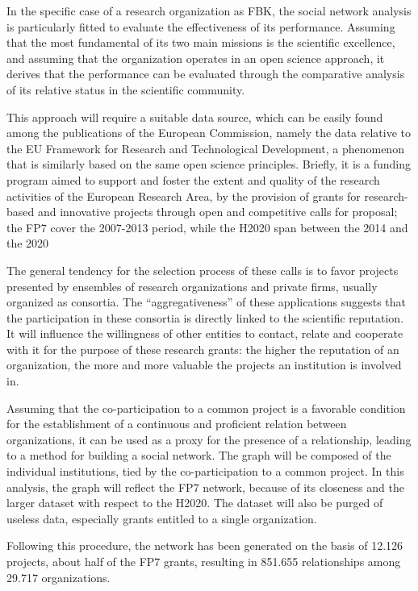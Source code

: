 In the specific case of a research organization as FBK, the social network analysis is particularly fitted to evaluate the effectiveness of its performance. Assuming that the most fundamental of its two main missions is the scientific excellence, and assuming that the organization operates in an open science approach, it derives that the performance can be evaluated through the comparative analysis of its relative status in the scientific community.

This approach will require a suitable data source, which can be easily found among the publications of the European Commission, namely the data relative to the EU Framework for Research and Technological Development, a phenomenon that is similarly based on the same open science principles. Briefly, it is a funding program aimed to support and foster the extent and quality of the research activities of the European Research Area, by the provision of grants for research-based and innovative projects through open and competitive calls for proposal; the FP7 cover the 2007-2013 period, while the H2020 span between the 2014 and the 2020

The general tendency for the selection process of these calls is to favor projects presented by ensembles of research organizations and private firms, usually organized as consortia. The \enquote{aggregativeness} of these applications suggests that the participation in these consortia is directly linked to the scientific reputation. It will influence the willingness of other entities to contact, relate and cooperate with it for the purpose of these research grants: the higher the reputation of an organization, the more and more valuable the projects an institution is involved in.

Assuming that the co-participation to a common project is a favorable condition for the establishment of a continuous and proficient relation between organizations, it can be used as a proxy for the presence of a relationship, leading to a method for building a social network. The graph will be composed of the individual institutions, tied by the co-participation to a common project. In this analysis, the graph will reflect the FP7 network, because of its closeness and the larger dataset with respect to the H2020. The dataset will also be purged of useless data, especially grants entitled to a single organization. 

Following this procedure, the network has been generated on the basis of 12.126 projects, about half of the FP7 grants, resulting in 851.655 relationships among 29.717 organizations. 

